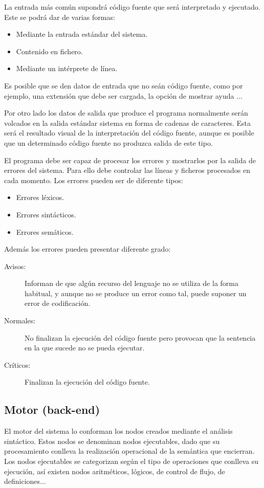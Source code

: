 La entrada más común supondrá código fuente que será interpretado y ejecutado. Este se podrá dar de varias formas:

\begin{itemize}
\item Mediante la entrada estándar del sistema.
\item Contenido en fichero.
\item Mediante un intérprete de línea.
\end{itemize}

Es posible que se den datos de entrada que no seán código fuente, como por ejemplo, una extensión que debe ser cargada, la opción de mostrar ayuda ...

Por otro lado los datos de salida que produce el programa normalmente serán volcados en la salida estándar sistema en forma de cadenas de caracteres. 
Esta será el resultado visual de la interpretación del código fuente, aunque es posible que un determinado código fuente no produzca salida de este tipo. 

El programa debe ser capaz de procesar los errores y mostrarlos por la salida de errores del sistema. Para ello debe controlar las líneas y ficheros procesados en cada
momento. Los errores pueden ser de diferente tipos:

\begin{itemize}
\item Errores léxicos.
\item Errores sintácticos.
\item Errores semáticos.
\end{itemize}

Además los errores pueden presentar diferente grado:

\begin{description}
\item [Avisos:] Informan de que algún recurso del lenguaje no se utiliza de la forma habitual, y aunque no se produce un error como tal, puede suponer un error de codificación.
\item [Normales:] No finalizan la ejecución del código fuente pero provocan que la sentencia en la que sucede no se pueda ejecutar.
\item [Críticos:] Finalizan la ejecución del código fuente.
\end{description}

\subsection{Motor (back-end)}
El motor del sistema lo conforman los nodos creados mediante el análisis sintáctico. Estos nodos se denominan nodos ejecutables, dado que su procesamiento conlleva la realización operacional
de la semántica que encierran. Los nodos ejecutables se categorizan según el tipo de operaciones que conlleva su ejecución, así existen nodos aritméticos, lógicos, de control de flujo, 
de definiciones... 

